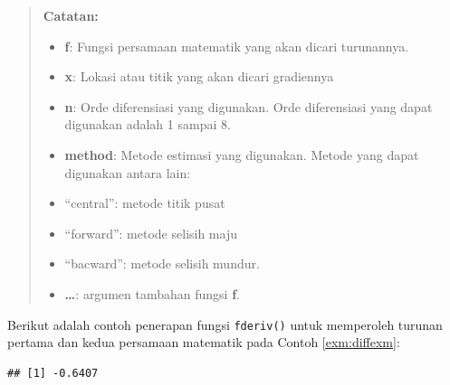 \documentclass[]{book}
\newenvironment{Shaded}{\begin{snugshade}}{\end{snugshade}}
\newcommand{\CommentTok}[1]{\textcolor[rgb]{0.56,0.35,0.01}{\textit{#1}}}
\newcommand{\ControlFlowTok}[1]{\textcolor[rgb]{0.13,0.29,0.53}{\textbf{#1}}}
\newcommand{\DataTypeTok}[1]{\textcolor[rgb]{0.13,0.29,0.53}{#1}}
\newcommand{\DecValTok}[1]{\textcolor[rgb]{0.00,0.00,0.81}{#1}}
\newcommand{\KeywordTok}[1]{\textcolor[rgb]{0.13,0.29,0.53}{\textbf{#1}}}
\newcommand{\NormalTok}[1]{#1}
\newcommand{\OperatorTok}[1]{\textcolor[rgb]{0.81,0.36,0.00}{\textbf{#1}}}
\newcommand{\StringTok}[1]{\textcolor[rgb]{0.31,0.60,0.02}{#1}}
\providecommand{\tightlist}{%
  \setlength{\itemsep}{0pt}\setlength{\parskip}{0pt}}
\theoremstyle{definition}
\theoremstyle{definition}
\theoremstyle{definition}
\theoremstyle{remark}
\begin{document}
\begin{quote}
\textbf{Catatan:}

\begin{itemize}
\tightlist
\item
  \textbf{f}: Fungsi persamaan matematik yang akan dicari turunannya.
\item
  \textbf{x}: Lokasi atau titik yang akan dicari gradiennya
\item
  \textbf{n}: Orde diferensiasi yang digunakan. Orde diferensiasi yang dapat digunakan adalah 1 sampai 8.
\item
  \textbf{method}: Metode estimasi yang digunakan. Metode yang dapat digunakan antara lain:
\item
  ``central'': metode titik pusat
\item
  ``forward'': metode selisih maju
\item
  ``bacward'': metode selisih mundur.
\item
  \textbf{\ldots{}}: argumen tambahan fungsi \textbf{f}.
\end{itemize}
\end{quote}

Berikut adalah contoh penerapan fungsi \texttt{fderiv()} untuk memperoleh turunan pertama dan kedua persamaan matematik pada Contoh \ref{exm:diffexm}:

\begin{Shaded}
\end{Shaded}

\begin{verbatim}
## [1] -0.6407
\end{verbatim}
\end{document}

